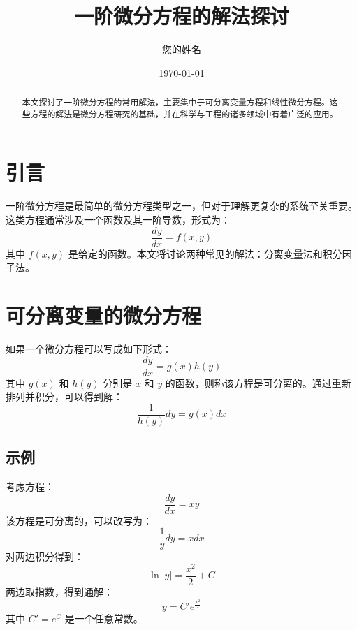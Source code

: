 \documentclass[12pt]{ctexart}
\title{一阶微分方程的解法探讨}
\author{您的姓名}
\date{\today}
\begin{document}
\maketitle

\begin{abstract}
本文探讨了一阶微分方程的常用解法，主要集中于可分离变量方程和线性微分方程。这些方程的解法是微分方程研究的基础，并在科学与工程的诸多领域中有着广泛的应用。
\end{abstract}

\section{引言}

一阶微分方程是最简单的微分方程类型之一，但对于理解更复杂的系统至关重要。这类方程通常涉及一个函数及其一阶导数，形式为：
\begin{equation}
\frac{dy}{dx} = f(x, y)
\end{equation}
其中 \( f(x, y) \) 是给定的函数。本文将讨论两种常见的解法：分离变量法和积分因子法。

\section{可分离变量的微分方程}

如果一个微分方程可以写成如下形式：
\begin{equation}
\frac{dy}{dx} = g(x)h(y)
\end{equation}
其中 \( g(x) \) 和 \( h(y) \) 分别是 \( x \) 和 \( y \) 的函数，则称该方程是可分离的。通过重新排列并积分，可以得到解：
\begin{equation}
\frac{1}{h(y)} dy = g(x) dx
\end{equation}

\subsection{示例}

考虑方程：
\begin{equation}
\frac{dy}{dx} = xy
\end{equation}
该方程是可分离的，可以改写为：
\begin{equation}
\frac{1}{y} dy = x dx
\end{equation}
对两边积分得到：
\begin{equation}
\ln|y| = \frac{x^2}{2} + C
\end{equation}
两边取指数，得到通解：
\begin{equation}
y = C'e^{\frac{x^2}{2}}
\end{equation}
其中 \( C' = e^C \) 是一个任意常数。
\end{document}
